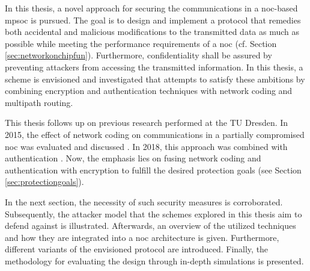 In this thesis, a novel approach for securing the communications in a \gls{noc}-based \gls{mpsoc} is pursued. The goal is to design and implement a protocol that
remedies both accidental and malicious modifications to the transmitted data as much as possible while meeting the performance requirements of a \gls{noc} (cf. Section
\ref{sec:networkonchipfun}). Furthermore, confidentiality shall be assured by preventing attackers from accessing the transmitted information. In this
thesis, a scheme is envisioned and investigated that attempts to satisfy these ambitions by combining encryption and authentication techniques with
network coding and multipath routing.

This thesis follows up on previous research performed at the TU Dresden. In 2015, the effect of network coding on communications in a partially
compromised \gls{noc} was evaluated and discussed \cite{moriam15manycorenc}. In 2018, this approach was combined with authentication
\cite{moriam18activeattackers}. Now, the emphasis lies on fusing network coding and authentication with encryption to fulfill the desired protection
goals (see Section \ref{sec:protectiongoals}).

In the next section, the necessity of such security measures is corroborated. Subsequently, the attacker model that the schemes explored in this
thesis aim to defend against is illustrated. Afterwards, an overview of the utilized techniques and how they are
integrated into a \gls{noc} architecture is given. Furthermore, different variants of the envisioned protocol are introduced. Finally, the
methodology for evaluating the design through in-depth simulations is presented.

